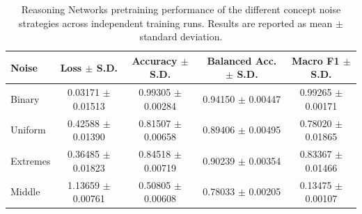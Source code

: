 \begin{table}[t]
\centering
\begin{tabular}{l c c c c}
\toprule
Noise & Loss $\pm$ S.D. & Accuracy $\pm$ S.D. & Balanced Acc. $\pm$ S.D. & Macro F1 $\pm$ S.D. \\
\midrule
Binary & 0.03171 $\pm$ 0.01513 & 0.99305 $\pm$ 0.00284 & 0.94150 $\pm$ 0.00447 & 0.99265 $\pm$ 0.00171 \\
Uniform & 0.42588 $\pm$ 0.01390 & 0.81507 $\pm$ 0.00658 & 0.89406 $\pm$ 0.00495 & 0.78020 $\pm$ 0.01865 \\
Extremes & 0.36485 $\pm$ 0.01823 & 0.84518 $\pm$ 0.00719 & 0.90239 $\pm$ 0.00354 & 0.83367 $\pm$ 0.01466 \\
Middle & 1.13659 $\pm$ 0.00761 & 0.50805 $\pm$ 0.00608 & 0.78033 $\pm$ 0.00205 & 0.13475 $\pm$ 0.00107 \\
\bottomrule
\end{tabular}
\caption{Reasoning Networks pretraining performance of the different concept noise strategies across independent training runs. Results are reported as mean $\pm$ standard deviation.}
\label{tab:noise_selection_rn}
\end{table}
